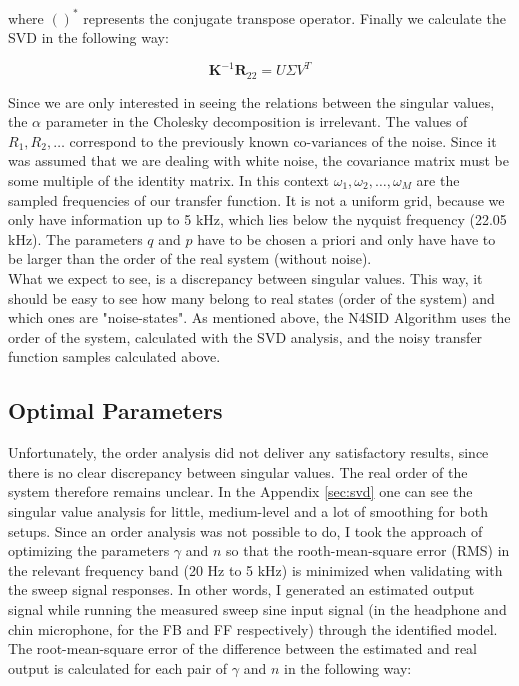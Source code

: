 where $()^*$ represents the conjugate transpose operator. Finally we calculate the SVD in the following way:

\[\textbf{K}^{-1}\textbf{R}_{22} = U\Sigma V^T\]

Since we are only interested in seeing the relations between the singular values, the $\alpha$ parameter in the Cholesky decomposition is irrelevant. The values of $R_1, R_2, \dots$ correspond to the previously known co-variances of the noise. Since it was assumed that we are dealing with white noise, the covariance matrix must be some multiple of the identity matrix. In this context $\omega_1, \omega_2,\dots,\omega_M$ are the sampled frequencies of our transfer function. It is not a uniform grid, because we only have information up to 5 kHz, which lies below the nyquist frequency (22.05 kHz). The parameters $q$ and $p$ have to be chosen a priori and only have have to be larger than the order of the real system (without noise).\\

What we expect to see, is a discrepancy between singular values. This way, it should be easy to see how many belong to real states (order of the system) and which ones are "noise-states". As mentioned above, the N4SID Algorithm uses the order of the system, calculated with the SVD analysis, and the noisy transfer function samples calculated above. 

\subsection{Optimal Parameters}

Unfortunately, the order analysis did not deliver any satisfactory results, since there is no clear discrepancy between singular values. The real order of the system therefore remains unclear. In the Appendix \ref{sec:svd} one can see the singular value analysis for little, medium-level and a lot of smoothing for both setups. Since an order analysis was not possible to do, I took the approach of optimizing the parameters $\gamma$ and $n$ so that the rooth-mean-square error (RMS) in the relevant frequency band (20 Hz to 5 kHz) is minimized when validating with the sweep signal responses. In other words, I generated an estimated output signal while running the measured sweep sine input signal (in the headphone and chin microphone, for the FB and FF respectively) through the identified model. The root-mean-square error of the difference between the estimated and real output is calculated for each pair of $\gamma$ and $n$ in the following way:

